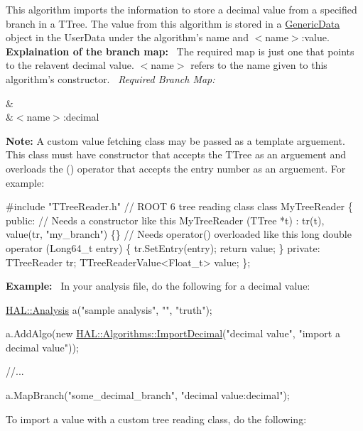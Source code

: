 This algorithm imports the information to store a decimal value from a specified branch in a T\+Tree. The value from this algorithm is stored in a \hyperlink{class_h_a_l_1_1_generic_data}{Generic\+Data} object in the User\+Data under the algorithm's name and $<$name$>$\+:value.~\newline
~\newline
{\bfseries Explaination of the branch map\+:}~\newline
The required map is just one that points to the relavent decimal value. $<$name$>$ refers to the name given to this algorithm's constructor.~\newline
{\itshape Required Branch Map\+:} \begin{TabularC}{2}
\hline
{}&\PBS{}\\
&\PBS\centering $<$name$>$\+:decimal \\
\end{TabularC}
{\bfseries Note\+:} A custom value fetching class may be passed as a template arguement. This class must have constructor that accepts the T\+Tree as an arguement and overloads the () operator that accepts the entry number as an arguement. For example\+: 
\begin{DoxyCode}
\textcolor{preprocessor}{#include "TTreeReader.h"} \textcolor{comment}{// ROOT 6 tree reading class}
\textcolor{keyword}{class }MyTreeReader \{
\textcolor{keyword}{public}:
 \textcolor{comment}{// Needs a constructor like this}
 MyTreeReader (TTree *t) : tr(t), value(tr, \textcolor{stringliteral}{"my\_branch"}) \{\}
 \textcolor{comment}{// Needs operator() overloaded like this}
 \textcolor{keywordtype}{long} \textcolor{keywordtype}{double} operator (Long64\_t entry) \{
   tr.SetEntry(entry);
   \textcolor{keywordflow}{return} value;
 \}
\textcolor{keyword}{private}:
 TTreeReader tr;
 TTreeReaderValue<Float\_t> value;
\};
\end{DoxyCode}
 {\bfseries Example\+:}~\newline
In your analysis file, do the following for a decimal value\+:


\begin{DoxyCode}
\hyperlink{class_h_a_l_1_1_analysis}{HAL::Analysis} a(\textcolor{stringliteral}{"sample analysis"}, \textcolor{stringliteral}{""}, \textcolor{stringliteral}{"truth"});

a.AddAlgo(\textcolor{keyword}{new} \hyperlink{class_h_a_l_1_1_algorithms_1_1_import_decimal_value}{HAL::Algorithms::ImportDecimal}(\textcolor{stringliteral}{"decimal value"}, \textcolor{stringliteral}{"import a
       decimal value"}));

\textcolor{comment}{//...}

a.MapBranch(\textcolor{stringliteral}{"some\_decimal\_branch"}, \textcolor{stringliteral}{"decimal value:decimal"});
\end{DoxyCode}
 To import a value with a custom tree reading class, do the following\+:


